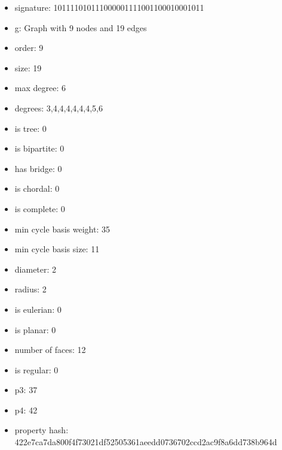 \newpage
\begin{figure}
\end{figure}
\begin{itemize}
\item signature: 101111010111000001111001100010001011
\item g: Graph with 9 nodes and 19 edges
\item order: 9
\item size: 19
\item max degree: 6
\item degrees: 3,4,4,4,4,4,4,5,6
\item is tree: 0
\item is bipartite: 0
\item has bridge: 0
\item is chordal: 0
\item is complete: 0
\item min cycle basis weight: 35
\item min cycle basis size: 11
\item diameter: 2
\item radius: 2
\item is eulerian: 0
\item is planar: 0
\item number of faces: 12
\item is regular: 0
\item p3: 37
\item p4: 42
\item property hash: 422e7ca7da800f4f73021df52505361aeedd0736702ccd2ac9f8a6dd738b964d
\end{itemize}
